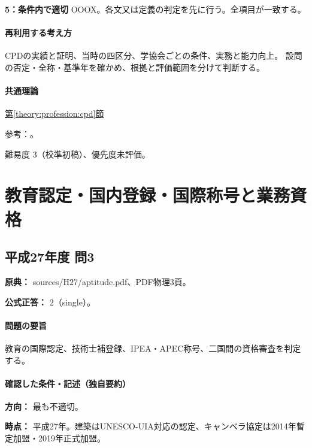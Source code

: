 \noindent\textbf{5：条件内で適切} OOOX。各文又は定義の判定を先に行う。全項目が一致する。\par

\paragraph{再利用する考え方} CPDの実績と証明、当時の四区分、学協会ごとの条件、実務と能力向上。 設問の否定・全称・基準年を確かめ、根拠と評価範囲を分けて判断する。

\paragraph{共通理論} \hyperref[theory:profession:cpd]{第\ref*{theory:profession:cpd}節}

\par 参考：\cite{cpd_v3,cpd_versions,cpd_new2021}。

\par 難易度 3（校準初稿）、優先度未評価。

\section{教育認定・国内登録・国際称号と業務資格}

\subsection{平成27年度 問3}
\label{q:h27-reg-apt-03}

\noindent\textbf{原典：} sources/H27/aptitude.pdf、PDF物理3頁。

\textbf{公式正答：} 2（single）。

\paragraph{問題の要旨} 教育の国際認定、技術士補登録、IPEA・APEC称号、二国間の資格審査を判定する。

\paragraph{確認した条件・記述（独自要約）}\mbox{}\par

\noindent\textbf{方向：} 最も不適切。\par

\noindent\textbf{時点：} 平成27年。建築はUNESCO-UIA対応の認定、キャンベラ協定は2014年暫定加盟・2019年正式加盟。\par

